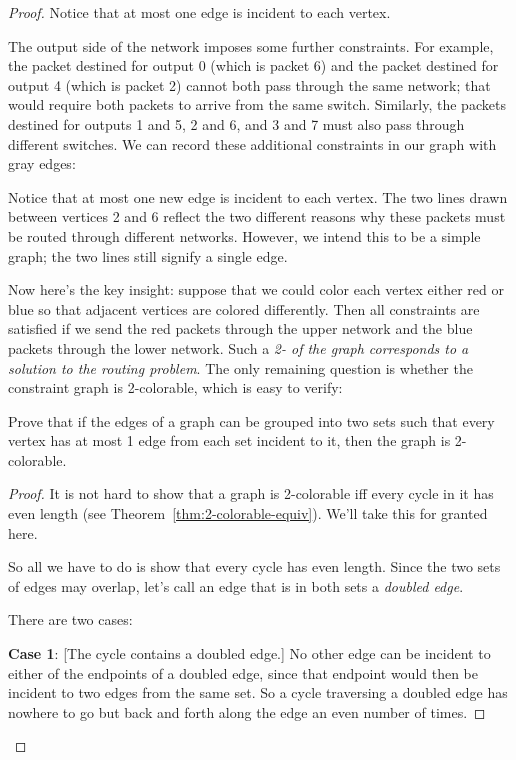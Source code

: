 \begin{proof}
Notice that at most one edge is incident to each vertex.

The output side of the network imposes some further constraints.  For
example, the packet destined for output 0 (which is packet 6) and the
packet destined for output 4 (which is packet 2) cannot both pass
through the same network; that would require both packets to arrive
from the same switch.  Similarly, the packets destined for outputs 1
and 5, 2 and 6, and 3 and 7 must also pass through different switches.
We can record these additional constraints in our graph with gray
edges:
\begin{center}
\end{center}

Notice that at most one new edge is incident to each vertex.
The two lines drawn between vertices 2 and 6 reflect the two different
reasons why these packets must be routed through different networks.
However, we intend this to be a simple graph; the two lines still
signify a single edge.

Now here's the key insight: suppose that we could color each vertex
either red or blue so that adjacent vertices are colored differently.
Then all constraints are satisfied if we send the red packets through
the upper network and the blue packets through the lower network.
Such a \textit{2- of the graph corresponds to a solution to
  the routing problem}.  The only remaining question is whether the
constraint graph is 2-colorable, which is easy to verify:

\begin{lemma}\label{deg1-union}
  Prove that if the edges of a graph can be grouped into two sets such
  that every vertex has at most 1 edge from each set incident to it, then
  the graph is 2-colorable.
\end{lemma}

\begin{proof}
It is not hard to show that a graph is 2-colorable iff every cycle in
it has even length (see Theorem~\ref{thm:2-colorable-equiv}).
We'll take this for granted here.

  \iffalse We know from Theorem~\ref{odd-cycle} that \fi
So all we have to do is show that every cycle has even length.  Since
the two sets of edges may overlap, let's call an edge that is in both
sets a \emph{doubled edge}.

There are two cases:

  \textbf{Case 1}: [The cycle contains a doubled edge.]  No other edge can
  be incident to either of the endpoints of a doubled edge, since that
  endpoint would then be incident to two edges from the same set.  So a
  cycle traversing a doubled edge has nowhere to go but back and forth
  along the edge an even number of times.


\end{proof}
\end{proof}
